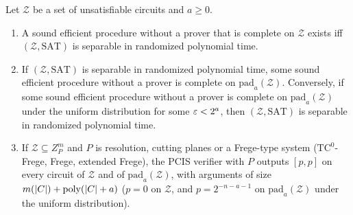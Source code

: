 \begin{proposition}\label{prop:canonical}
Let $\mathcal Z$ be a set of unsatisfiable circuits and $a\ge0$.
\begin{enumerate}[label=(\alph*)]
\item A sound efficient procedure without a prover that is complete on $\mathcal Z$
exists iff $(\mathcal Z,\mathrm{SAT})$ is separable in randomized polynomial time.
\item If $(\mathcal Z,\mathrm{SAT})$ is separable in randomized polynomial time, some
sound efficient procedure without a prover is complete on $\mathrm{pad}_a(\mathcal
Z)$. Conversely, if some sound efficient procedure without a prover is complete on
$\mathrm{pad}_a(\mathcal Z)$ under the uniform distribution for some $\varepsilon<2^a$,
then $(\mathcal Z,\mathrm{SAT})$ is separable in randomized polynomial time.
\item If $\mathcal Z\subseteq Z_P^m$ and $P$ is resolution, cutting planes or a
Frege-type system ($\mathrm{TC}^0$-Frege, Frege, extended Frege), the PCIS verifier
with $P$ outputs $[p,p]$ on every circuit of $\mathcal Z$ and of
$\mathrm{pad}_a(\mathcal Z)$, with arguments of size $m(|C|)+\mathrm{poly}(|C|+a)$ ($p=0$
on $\mathcal Z$, and $p=2^{-n-a-1}$ on $\mathrm{pad}_a(\mathcal Z)$ under the uniform
distribution).
\end{enumerate}
\end{proposition}


